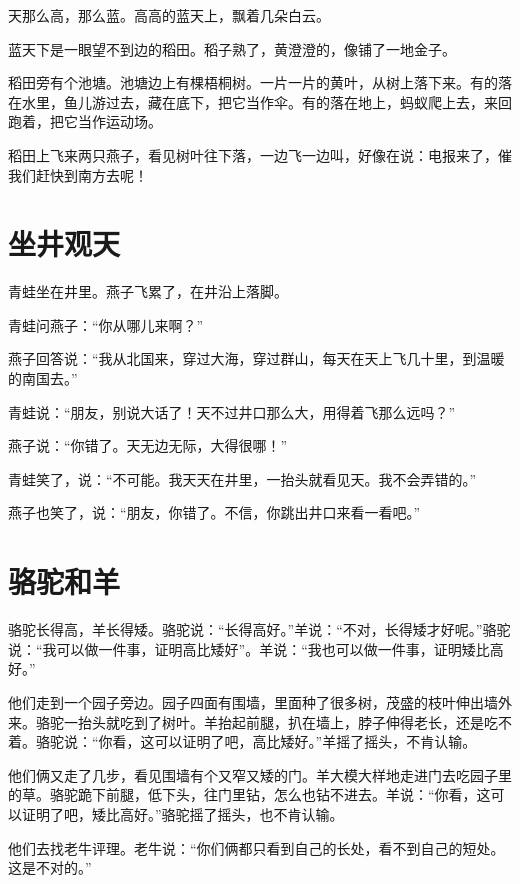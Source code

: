 \documentclass[12pt,UTF-8,openany]{ctexbook}
\begin{document}
\begin{large}
    
    天那么高，那么蓝。高高的蓝天上，飘着几朵白云。
    
    蓝天下是一眼望不到边的稻田。稻子熟了，黄澄澄的，像铺了一地金子。
    
    稻田旁有个池塘。池塘边上有棵梧桐树。一片一片的黄叶，从树上落下来。有的落在水里，鱼儿游过去，藏在底下，把它当作伞。有的落在地上，蚂蚁爬上去，来回跑着，把它当作运动场。
    
    稻田上飞来两只燕子，看见树叶往下落，一边飞一边叫，好像在说：电报来了，催我们赶快到南方去呢！
    
\end{large}



\chapter{坐井观天}

\begin{large}
    
    青蛙坐在井里。燕子飞累了，在井沿上落脚。
    
    青蛙问燕子：“你从哪儿来啊？”
    
    燕子回答说：“我从北国来，穿过大海，穿过群山，每天在天上飞几十里，到温暖的南国去。”
    
    青蛙说：“朋友，别说大话了！天不过井口那么大，用得着飞那么远吗？”
    
    燕子说：“你错了。天无边无际，大得很哪！”
    
    青蛙笑了，说：“不可能。我天天在井里，一抬头就看见天。我不会弄错的。”
    
    燕子也笑了，说：“朋友，你错了。不信，你跳出井口来看一看吧。”
    
\end{large}



\chapter{骆驼和羊}

\begin{large}
    
    骆驼长得高，羊长得矮。骆驼说：“长得高好。”羊说：“不对，长得矮才好呢。”骆驼说：“我可以做一件事，证明高比矮好”。羊说：“我也可以做一件事，证明矮比高好。”
    
    他们走到一个园子旁边。园子四面有围墙，里面种了很多树，茂盛的枝叶伸出墙外来。骆驼一抬头就吃到了树叶。羊抬起前腿，扒在墙上，脖子伸得老长，还是吃不着。骆驼说：“你看，这可以证明了吧，高比矮好。”羊摇了摇头，不肯认输。
    
    他们俩又走了几步，看见围墙有个又窄又矮的门。羊大模大样地走进门去吃园子里的草。骆驼跪下前腿，低下头，往门里钻，怎么也钻不进去。羊说：“你看，这可以证明了吧，矮比高好。”骆驼摇了摇头，也不肯认输。
    
    他们去找老牛评理。老牛说：“你们俩都只看到自己的长处，看不到自己的短处。这是不对的。”
    
\end{large}
\end{document}
